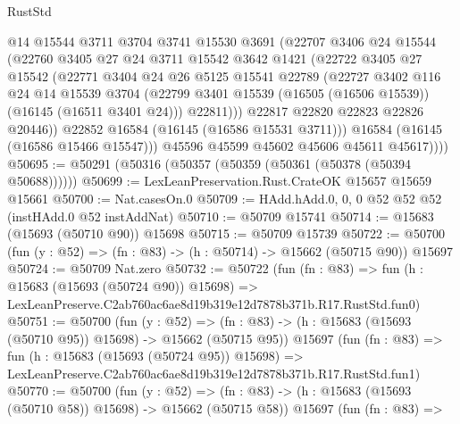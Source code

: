 \begin{lexlean}{RustStd}
\begin{coremodule}
                @14
                @15544
                @3711
                @3704
                @3741
                @15530
                @3691
                (@22707
                  @3406
                  @24
                  @15544
                  (@22760
                    @3405
                    @27
                    @24
                    @3711
                    @15542
                    @3642
                    @1421
                    (@22722
                      @3405
                      @27
                      @15542
                      (@22771
                        @3404
                        @24
                        @26
                        @5125
                        @15541
                        @22789
                        (@22727
                          @3402
                          @116
                          @24
                          @14
                          @15539
                          @3704
                          (@22799 @3401 @15539 (@16505 (@16506 @15539)) (@16145 (@16511 @3401 @24)))
                          @22811)))
                    @22817
                    @22820
                    @22823
                    @22826
                    @20446))
                @22852
                @16584
                (@16145 (@16586 @15531 @3711)))
              @16584
              (@16145 (@16586 @15466 @15547)))
            @45596
            @45599
            @45602
            @45606
            @45611
            @45617))))
@50695 := @50291 (@50316 (@50357 (@50359 (@50361 (@50378 (@50394 @50688))))))
@50699 := LexLeanPreservation.Rust.CrateOK @15657 @15659 @15661
@50700 := Nat.casesOn.{0}
@50709 := HAdd.hAdd.{0, 0, 0} @52 @52 @52 (instHAdd.{0} @52 instAddNat)
@50710 := @50709 @15741
@50714 := @15683 (@15693 (@50710 @90)) @15698
@50715 := @50709 @15739
@50722 := @50700 (fun (y : @52) => (fn : @83) -> (h : @50714) -> @15662 (@50715 @90)) @15697
@50724 := @50709 Nat.zero
@50732 := @50722
    (fun (fn : @83) =>
    fun (h : @15683 (@15693 (@50724 @90)) @15698) =>
    LexLeanPreserve.C2ab760ac6ae8d19b319e12d7878b371b.R17.RustStd.fun0)
@50751 := @50700
    (fun (y : @52) =>
    (fn : @83) -> (h : @15683 (@15693 (@50710 @95)) @15698) -> @15662 (@50715 @95))
    @15697
    (fun (fn : @83) =>
    fun (h : @15683 (@15693 (@50724 @95)) @15698) =>
    LexLeanPreserve.C2ab760ac6ae8d19b319e12d7878b371b.R17.RustStd.fun1)
@50770 := @50700
    (fun (y : @52) =>
    (fn : @83) -> (h : @15683 (@15693 (@50710 @58)) @15698) -> @15662 (@50715 @58))
    @15697
    (fun (fn : @83) =>

\end{coremodule}
\end{lexlean}

